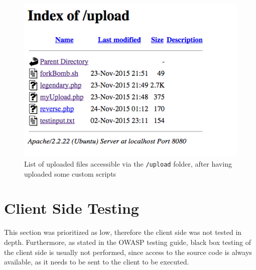\begin{figure}[h!tbp]
	\centering
	\includegraphics[width=\textwidth]{figures/Doge_Upload.png}
	\caption{List of uploaded files accessible via the \texttt{/upload} folder, after having uploaded some custom scripts}
\end{figure}

\clearpage
\section{Client Side Testing}
This section was prioritized as low, therefore the client side was not tested in depth. Furthermore, as stated in the OWASP testing guide, black box testing of the client side is usually not performed, since access to the source code is always available, as it needs to be sent to the client to be executed.

